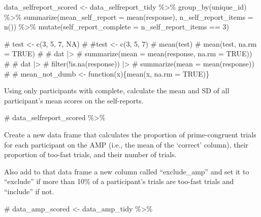 \documentclass[
  letterpaper,
  DIV=11,
  numbers=noendperiod]{scrreprt}
\newenvironment{Shaded}{\begin{snugshade}}{\end{snugshade}}
\newcommand{\AttributeTok}[1]{\textcolor[rgb]{0.40,0.45,0.13}{#1}}
\newcommand{\CommentTok}[1]{\textcolor[rgb]{0.37,0.37,0.37}{#1}}
\newcommand{\DecValTok}[1]{\textcolor[rgb]{0.68,0.00,0.00}{#1}}
\newcommand{\FunctionTok}[1]{\textcolor[rgb]{0.28,0.35,0.67}{#1}}
\newcommand{\NormalTok}[1]{\textcolor[rgb]{0.00,0.23,0.31}{#1}}
\newcommand{\OtherTok}[1]{\textcolor[rgb]{0.00,0.23,0.31}{#1}}
\newcommand{\SpecialCharTok}[1]{\textcolor[rgb]{0.37,0.37,0.37}{#1}}
\begin{document}
\begin{Shaded}
\begin{Highlighting}[]
\NormalTok{data\_selfreport\_scored }\OtherTok{\textless{}{-}}\NormalTok{ data\_selfreport\_tidy }\SpecialCharTok{\%\textgreater{}\%}
  \FunctionTok{group\_by}\NormalTok{(unique\_id) }\SpecialCharTok{\%\textgreater{}\%}
  \FunctionTok{summarize}\NormalTok{(}\AttributeTok{mean\_self\_report =} \FunctionTok{mean}\NormalTok{(response),}
            \AttributeTok{n\_self\_report\_items =} \FunctionTok{n}\NormalTok{()) }\SpecialCharTok{\%\textgreater{}\%}
  \FunctionTok{mutate}\NormalTok{(}\AttributeTok{self\_report\_complete =}\NormalTok{ n\_self\_report\_items }\SpecialCharTok{==} \DecValTok{3}\NormalTok{)}


\CommentTok{\# test \textless{}{-} c(3, 5, 7, NA)}
\CommentTok{\# \#test \textless{}{-} c(3, 5, 7)}
\CommentTok{\# mean(test)}
\CommentTok{\# mean(test, na.rm = TRUE)}
\CommentTok{\# }
\CommentTok{\# dat |\textgreater{}}
\CommentTok{\#   summarize(mean = mean(response, na.rm = TRUE))}
\CommentTok{\# }
\CommentTok{\# dat |\textgreater{}}
\CommentTok{\#   filter(!is.na(response)) |\textgreater{}}
\CommentTok{\#   summarize(mean = mean(response))}
\CommentTok{\# }
\CommentTok{\# mean\_not\_dumb \textless{}{-} function(x)\{mean(x, na.rm = TRUE)\}}
\end{Highlighting}
\end{Shaded}

Using only participants with complete, calculate the mean and SD of all
participant's mean scores on the self-reports.

\begin{Shaded}
\begin{Highlighting}[]
\CommentTok{\# data\_selfreport\_scored \%\textgreater{}\%}
\end{Highlighting}
\end{Shaded}

Create a new data frame that calculates the proportion of
prime-congruent trials for each participant on the AMP (i.e., the mean
of the `correct' column), their proportion of too-fast trials, and their
number of trials.

Also add to that data frame a new column called ``exclude\_amp'' and set
it to ``exclude'' if more than 10\% of a participant's trials are
too-fast trials and ``include'' if not.

\begin{Shaded}
\begin{Highlighting}[]
\CommentTok{\# data\_amp\_scored \textless{}{-} data\_amp\_tidy \%\textgreater{}\%}
\end{Highlighting}
\end{Shaded}
\end{document}
